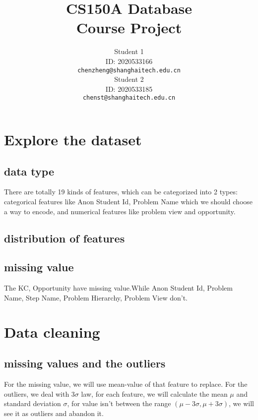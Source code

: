 \documentclass{article}
\title{CS150A Database \\Course Project}
\author{
    Student 1\\
    ID: 2020533166\\
    \texttt{chenzheng@shanghaitech.edu.cn} \\
    \And
    Student 2\\
    ID: 2020533185\\
    \texttt{chenst@shanghaitech.edu.cn}
}
\begin{document}

    \maketitle

    \begin{abstract}

    \end{abstract}


    \section{Explore the dataset}\label{sec:explore-the-dataset}

    \subsection{data type}
    There are totally 19 kinds of features, which can be categorized into 2 types: categorical features like Anon Student Id, Problem Name which we should choose a way to encode, and numerical features like problem view and opportunity.

    \subsection{distribution of features}

    \subsection{missing value}
    The KC, Opportunity have missing value.While Anon Student Id, Problem Name, Step Name, Problem Hierarchy, Problem View don't.


    \section{Data cleaning}\label{sec:data-cleaning}

    \subsection{missing values and the outliers}
    For the missing value, we will use mean-value of that feature to replace.
    For the outliers, we deal with $3\sigma$ law, for each feature, we will calculate the mean $\mu$ and standard deviation $\sigma$, for value isn't between the range $(\mu-3\sigma, \mu+3\sigma)$, we will see it as outliers and abandon it.
\end{document}
